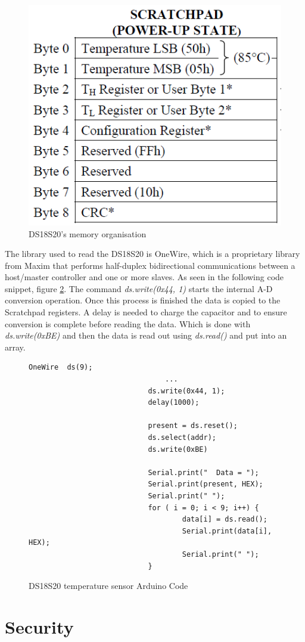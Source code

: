 \begin{figure}[H]
	\centering
	\includegraphics[width=.6\linewidth]{Figures/dsmem.png}
	\caption{DS18S20's memory organisation}
	\label{fig:dsmem}
\end{figure}

The library used to read the DS18S20 is OneWire, which is a proprietary library from Maxim that performs half-duplex bidirectional communications between a host/master controller and one or more slaves. As seen in the following code snippet, figure \ref{snip:tempcode}. The command \emph{ds.write(0x44, 1)} starts the internal A-D conversion operation. Once this process is finished the data is copied to the Scratchpad registers. A delay is needed to charge the capacitor and to ensure conversion is complete before reading the data. Which is done with \emph{ds.write(0xBE)} and then the data is read out using \emph{ds.read()} and put into an array.

\begin{figure}[H]
\begin{lstlisting}[style=Arduino]
  							OneWire  ds(9);
								...
  							ds.write(0x44, 1); 
  						 	delay(1000);

  							present = ds.reset();
  							ds.select(addr);    
 							ds.write(0xBE)

  							Serial.print("  Data = "); 
  							Serial.print(present, HEX);
 						 	Serial.print(" ");
  							for ( i = 0; i < 9; i++) {          
    								data[i] = ds.read();
    								Serial.print(data[i], HEX);
    								Serial.print(" ");
  							}

\end{lstlisting}
\caption{DS18S20 temperature sensor Arduino Code}
\label{snip:tempcode}
\end{figure}


\section{Security}


